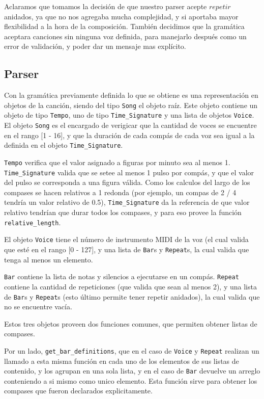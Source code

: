 \documentclass[a4paper, 10pt, twoside]{article}
\begin{document}
Aclaramos que tomamos la decisión de que nuestro parser acepte $repetir$ anidados, ya que no nos agregaba mucha complejidad, y si aportaba mayor flexibilidad a la hora de la composición.
También decidimos que la gramática aceptara canciones sin ninguna voz definida, para manejarlo después como un error de validación, y poder dar un mensaje mas explícito.

\subsection{Parser}

Con la gramática previamente definida lo que se obtiene es una representación en objetos de la canción, siendo del tipo \texttt{Song} el objeto raíz. Este objeto contiene un objeto de tipo \texttt{Tempo}, uno de tipo \texttt{Time\_Signature} y una lista de objetos \texttt{Voice}. El objeto \texttt{Song} es el encargado de verigicar que la cantidad de voces se encuentre en el rango [1 - 16], y que la duración de cada compás de cada voz sea igual a la definida en el objeto \texttt{Time\_Signature}.

\texttt{Tempo} verifica que el valor asignado a figuras por minuto sea al menos 1. \texttt{Time\_Signature} valida que se setee al menos 1 pulso por compás, y que el valor del pulso se corresponda a una figura válida. Como los calculos del largo de los compases se hacen relativos a 1 redonda (por ejemplo, un compas de 2 / 4 tendría un valor relativo de 0.5), \texttt{Time\_Signature} da la referencia de que valor relativo tendrían que durar todos los compases, y para eso provee la función \texttt{relative\_length}.

El objeto \texttt{Voice} tiene el número de instrumento MIDI de la voz (el cual valida que esté en el rango [0 - 127], y una lista de \texttt{Bar}s y \texttt{Repeat}s, la cual valida que tenga al menos un elemento.

\texttt{Bar} contiene la lista de notas y silencios a ejecutarse en un compás. \texttt{Repeat} contiene la cantidad de repeticiones (que valida que sean al menos 2), y una lista de \texttt{Bar}s y \texttt{Repeat}s (esto último permite tener repetir anidados), la cual valida que no se encuentre vacía.

Estos tres objetos proveen dos funciones comunes, que permiten obtener listas de compases. 

Por un lado, \texttt{get\_bar\_definitions}, que en el caso de \texttt{Voice} y \texttt{Repeat} realizan un llamado a esta misma función en cada uno de los elementos de sus listas de contenido, y los agrupan en una sola lista, y en el caso de \texttt{Bar} devuelve un arreglo conteniendo a si mismo como unico elemento. Esta función sirve para obtener los compases que fueron declarados explicitamente.
\end{document}
